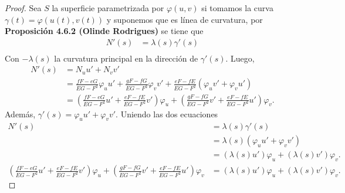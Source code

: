 \documentclass{article}
\begin{document}
\begin{proof}
    Sea \( S \) la superficie parametrizada por \( \varphi(u, v) \) si tomamos la curva \( \gamma(t) = \varphi(u(t), v(t)) \) y suponemos que es línea de curvatura,
    por \textbf{Proposición 4.6.2 (Olinde Rodrigues)} se tiene que \begin{align*}
        N'(s) & = \lambda(s) \gamma'(s) \\
    \end{align*}
    Con \( -\lambda(s) \) la curvatura principal en la dirección de \( \gamma'(s) \). Luego, \begin{align*}
        N'(s) & = N_u u' + N_v v'                                                                                                                                                          \\
              & = \frac{fF - eG}{EG - F^2} \varphi_u u' + \frac{gF - fG}{EG - F^2} \varphi_v v' + \frac{eF - fE}{EG - F^2} (\varphi_u v' + \varphi_v u')                                   \\
              & = \left( \frac{fF - eG}{EG - F^2} u' + \frac{eF - fE}{EG - F^2} v' \right) \varphi_u + \left( \frac{gF - fG}{EG - F^2} v' + \frac{eF - fE}{EG - F^2} u' \right) \varphi_v.
    \end{align*}
    Además, \( \gamma'(s) = \varphi_u u' + \varphi_v v'. \)
    Uniendo las dos ecuaciones \begin{align*}
        N'(s)                                                                                                                                                                   & = \lambda(s) \gamma'(s)                                                            \\
                                                                                                                                                                                & = \lambda(s) (\varphi_u u' + \varphi_v v')                                         \\
                                                                                                                                                                                & = \left( \lambda(s) u' \right) \varphi_u + \left( \lambda(s) v' \right) \varphi_v. \\
        \left( \frac{fF - eG}{EG - F^2} u' + \frac{eF - fE}{EG - F^2} v' \right) \varphi_u + \left( \frac{gF - fG}{EG - F^2} v' + \frac{eF - fE}{EG - F^2} u' \right) \varphi_v & = \left( \lambda(s) u' \right) \varphi_u + \left( \lambda(s) v' \right) \varphi_v.

\end{align*}
\end{proof}
\end{document}
